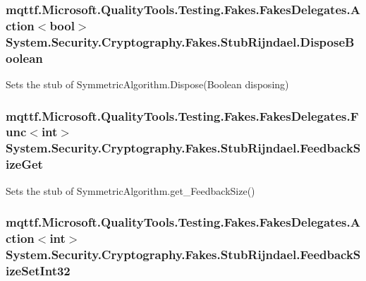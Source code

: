 \hypertarget{class_system_1_1_security_1_1_cryptography_1_1_fakes_1_1_stub_rijndael_a9daf05766f56cc81debb8088f9e1eab3}{
\subsubsection[{Dispose\-Boolean}]{\setlength{\rightskip}{0pt plus 5cm}mqttf.\-Microsoft.\-Quality\-Tools.\-Testing.\-Fakes.\-Fakes\-Delegates.\-Action$<$bool$>$ System.\-Security.\-Cryptography.\-Fakes.\-Stub\-Rijndael.\-Dispose\-Boolean}}\label{class_system_1_1_security_1_1_cryptography_1_1_fakes_1_1_stub_rijndael_a9daf05766f56cc81debb8088f9e1eab3}


Sets the stub of Symmetric\-Algorithm.\-Dispose(\-Boolean disposing)

\hypertarget{class_system_1_1_security_1_1_cryptography_1_1_fakes_1_1_stub_rijndael_a6bb263285a2530a3fb1722f49c248a04}{
\subsubsection[{Feedback\-Size\-Get}]{\setlength{\rightskip}{0pt plus 5cm}mqttf.\-Microsoft.\-Quality\-Tools.\-Testing.\-Fakes.\-Fakes\-Delegates.\-Func$<$int$>$ System.\-Security.\-Cryptography.\-Fakes.\-Stub\-Rijndael.\-Feedback\-Size\-Get}}\label{class_system_1_1_security_1_1_cryptography_1_1_fakes_1_1_stub_rijndael_a6bb263285a2530a3fb1722f49c248a04}


Sets the stub of Symmetric\-Algorithm.\-get\-\_\-\-Feedback\-Size()

\hypertarget{class_system_1_1_security_1_1_cryptography_1_1_fakes_1_1_stub_rijndael_a8c7c0bcc06f5839f47d7d6c3943feb7a}{
\subsubsection[{Feedback\-Size\-Set\-Int32}]{\setlength{\rightskip}{0pt plus 5cm}mqttf.\-Microsoft.\-Quality\-Tools.\-Testing.\-Fakes.\-Fakes\-Delegates.\-Action$<$int$>$ System.\-Security.\-Cryptography.\-Fakes.\-Stub\-Rijndael.\-Feedback\-Size\-Set\-Int32}}\label{class_system_1_1_security_1_1_cryptography_1_1_fakes_1_1_stub_rijndael_a8c7c0bcc06f5839f47d7d6c3943feb7a}


